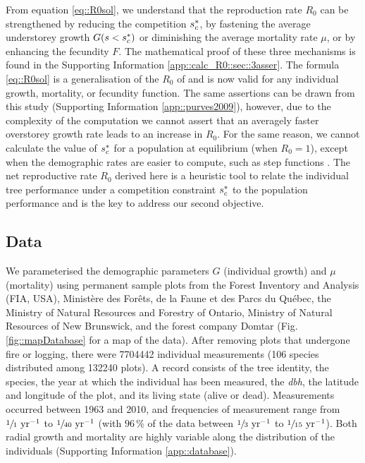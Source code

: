 From equation \eqref{eq::R0sol}, we understand that the reproduction rate $ R_0 $ can be strengthened by reducing the competition $ {s}^{*}_c $, by fastening the average understorey growth $ G(s < {s}^{*}_c) $ or diminishing the average mortality rate $ \mu $, or by enhancing the fecundity $ F $. The mathematical proof of these three mechanisms is found in the Supporting Information \ref{app::calc_R0::sec::3asser}. The formula \eqref{eq::R0sol} is a generalisation of the $ R_0 $ of \citet{Purves2009} and is now valid for any individual growth, mortality, or fecundity function. The same assertions can be drawn from this study (Supporting Information \ref{app::purves2009}), however, due to the complexity of the computation we cannot assert that an averagely faster overstorey growth rate leads to an increase in $ R_0 $. For the same reason, we cannot calculate the value of $ {s}^{*}_c $ for a population at equilibrium (\ie when $ R_0 = 1 $), except when the demographic rates are easier to compute, such as step functions \citep[Supporting Information \ref{app::purves2009} for the proof]{Purves2009}. The net reproductive rate $ R_0 $ derived here is a heuristic tool to relate the individual tree performance under a competition constraint $ {s}^{*}_c $ to the population performance and is the key to address our second objective.

\subsection{Data}
We parameterised the demographic parameters $ G $ (individual growth) and $ \mu $ (mortality) using permanent sample plots from the Forest Inventory and Analysis (FIA, USA), Ministère des Forêts, de la Faune et des Parcs du Québec, the Ministry of Natural Resources and Forestry of Ontario, Ministry of Natural Resources of New Brunswick, and the forest company Domtar (Fig. \ref{fig::mapDatabase} for a map of the data). After removing plots that undergone fire or logging, there were \num{7704442} individual measurements (106 species distributed among \num{132240} plots). A record consists of the tree identity, the species, the year at which the individual has been measured, the \textit{dbh}, the latitude and longitude of the plot, and its living state (alive or dead). Measurements occurred between 1963 and 2010, and frequencies of measurement range from $ \sfrac{1}{1} \text{ yr}^{-1} $ to $ \sfrac{1}{40} \text{ yr}^{-1} $ (with $ 96 \, \% $ of the data between $ \sfrac{1}{3} \text{ yr}^{-1} $ to $ \sfrac{1}{15} \text{ yr}^{-1} $). Both radial growth and mortality are highly variable along the distribution of the individuals (Supporting Information \ref{app::database}).

